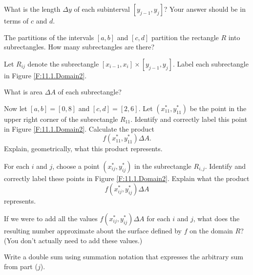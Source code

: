 \begin{activity}
	\item What is the length $\Delta y$ of each subinterval $[y_{j-1},y_j]$? Your answer should be in terms of $c$ and $d$.
	
	

	\item The partitions of the intervals $[a,b]$ and $[c,d]$ partition the rectangle $R$ into subrectangles. How many subrectangles are there?
	
	
	
	\item Let $R_{ij}$ denote the subrectangle $[x_{i-1},x_i] \times [y_{j-1},y_j]$. Label each subrectangle in Figure \ref{F:11.1.Domain2}.
	
	
	
	\item What is area $\Delta A$ of each subrectangle?
	
	
	
	\item Now let $[a,b] = [0,8]$ and $[c,d] = [2,6]$.  Let $(x_{11}^*,y_{11}^*)$ be the point in the upper right corner of the subrectangle $R_{11}$. Identify and correctly label this point in Figure \ref{F:11.1.Domain2}. Calculate the product
\[f(x_{11}^*,y_{11}^*) \Delta A.\]
Explain, geometrically, what this product represents.

	
	
	\item For each $i$ and $j$, choose a point $(x_{ij}^*,y_{ij}^*)$ in the subrectangle $R_{i,j}$. Identify and correctly label these points in Figure \ref{F:11.1.Domain2}. Explain what the product
\[f(x_{ij}^*,y_{ij}^*) \Delta A\]
represents.

	
	
	\item \label{p:11.1.Rsum_1} If we were to add all the values $f(x_{ij}^*,y_{ij}^*) \Delta A$ for each $i$ and $j$, what does the resulting number approximate about the surface defined by $f$ on the domain $R$? (You don't actually need to add these values.)

	
	
	\item Write a double sum using summation notation that expresses the arbitrary sum from part ($j$).
	


    \ea


\end{activity}
\begin{smallhint}

\end{smallhint}
